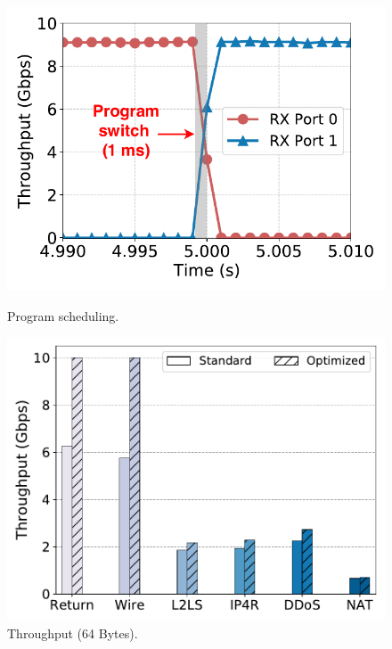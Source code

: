 \begin{figure}[th]
  \centering
   \begin{minipage}[b]{0.3\textwidth} %
     \includegraphics[width=1.\linewidth]{figures/job-sched.pdf}
     \caption{Program scheduling.}
     \label{fig:jobsched}
   \end{minipage}
    \hspace{0.2cm}
  \begin{minipage}[b]{0.3\textwidth}
    \includegraphics[width=.98\textwidth]{figures/throughput_gbps_64B.pdf}
    \caption{Throughput (64 Bytes).}
    \label{fig:throughput64}
  \end{minipage}
  \hspace{0.2cm}
  \begin{minipage}[b]{0.3\textwidth}

\end{minipage}
\end{figure}
